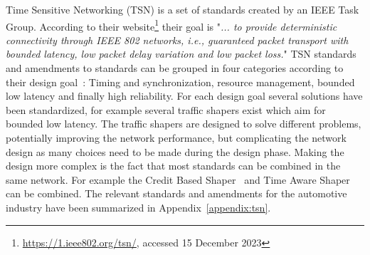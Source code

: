 Time Sensitive Networking (TSN) is a set of standards created by an IEEE Task Group. According to their website\footnote{\url{https://1.ieee802.org/tsn/}, accessed 15 December 2023} their goal is "\textit{... to provide deterministic connectivity through IEEE 802 networks, i.e., guaranteed packet transport with bounded latency, low packet delay variation and low packet loss.}" TSN standards and amendments to standards can be grouped in four categories according to their design goal~\cite{ashjaei2021time}: Timing and synchronization, resource management, bounded low latency and finally high reliability. For each design goal several solutions have been standardized, for example several traffic shapers exist which aim for bounded low latency. The traffic shapers are designed to solve different problems, potentially improving the network performance, but complicating the network design as many choices need to be made during the design phase. Making the design more complex is the fact that most standards can be combined in the same network. For example the Credit Based Shaper~\cite{IEEE8021Qav} and Time Aware Shaper~\cite{IEEE8021Qbv} can be combined. The relevant standards and amendments for the automotive industry have been summarized in Appendix~\ref{appendix:tsn}.